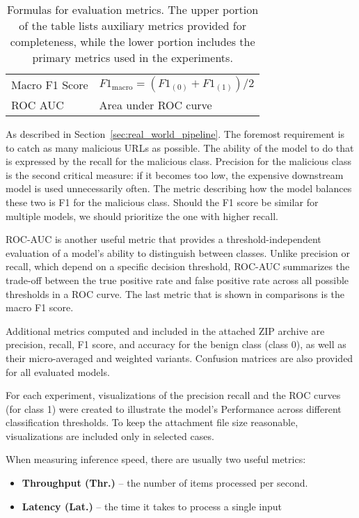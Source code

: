\begin{table}[H]
\begin{tabular}{lp{}}
        Macro F1 Score             & $F1_{\text{macro}} = (F1_{(0)} + F1_{(1)}) / 2$                                                                         \\
        ROC AUC                    & Area under ROC curve                                                                                                    \\
        \bottomrule
    \end{tabular}
    \caption{Formulas for evaluation metrics. The upper portion of the table lists auxiliary metrics provided for completeness, while the lower portion includes the primary metrics used in the experiments.}
    \label{tab:metric_formulas}
\end{table}

As described in Section~\ref{sec:real_world_pipeline}. The foremost requirement is to catch as many malicious URLs as possible. The ability of the model to do that is expressed by the recall for the malicious class. Precision for the malicious class is the second critical measure: if it becomes too low, the expensive downstream model is used unnecessarily often. The metric describing how the model balances these two is F1 for the malicious class. Should the F1 score be similar for multiple models, we should prioritize the one with higher recall.

ROC-AUC is another useful metric that provides a threshold-independent evaluation of a model's ability to distinguish between classes. Unlike precision or recall, which depend on a specific decision threshold, ROC-AUC summarizes the trade-off between the true positive rate and false positive rate across all possible thresholds in a ROC curve. The last metric that is shown in comparisons is the macro F1 score.

Additional metrics computed and included in the attached ZIP archive are precision, recall, F1 score, and accuracy for the benign class (class 0), as well as their micro-averaged and weighted variants. Confusion matrices are also provided for all evaluated models.

For each experiment, visualizations of the precision recall and the ROC curves (for class 1) were created to illustrate the model's Performance across different classification thresholds. To keep the attachment file size reasonable, visualizations are included only in selected cases.

When measuring inference speed, there are usually two useful metrics:
\begin{itemize}
    \item \textbf{Throughput (Thr.)} -- the number of items processed per second.
    \item \textbf{Latency (Lat.)} -- the time it takes to process a single input
\end{itemize}

